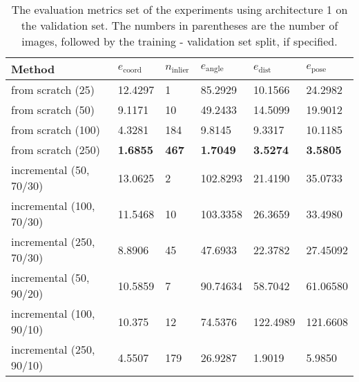 \begin{table}[]
\centering
\begin{tabular}{|l||lllll|} \hline
Method                   & $e_{\text{coord}}$ & $n_{\text{inlier}}$ & $e_{\text{angle}}$ & $e_{\text{dist}}$ & $e_{\text{pose}}$ \\ \hline \hline
from scratch (25)        & 12.4297            & 1                   & 85.2929            & 10.1566           & 24.2982           \\ \hline
from scratch (50)        & 9.1171             & 10                  & 49.2433            & 14.5099           & 19.9012           \\ \hline 
from scratch (100)       & 4.3281             & 184                 & 9.8145             & 9.3317            & 10.1185           \\ \hline
from scratch (250)       & \textbf{1.6855}             & \textbf{467}                 & \textbf{1.7049}             & \textbf{3.5274}            & \textbf{3.5805}            \\ \hline \rowcolor{Gray}
incremental (50, 70/30)  & 13.0625            & 2                   & 102.8293           & 21.4190           & 35.0733           \\ \hline\rowcolor{Gray}
incremental (100, 70/30) & 11.5468            & 10                  & 103.3358           & 26.3659           & 33.4980           \\ \hline \rowcolor{Gray}
incremental (250, 70/30) & 8.8906             & 45                  & 47.6933            & 22.3782           & 27.45092          \\ \hline
incremental (50, 90/20)  & 10.5859            & 7                   & 90.74634           & 58.7042           & 61.06580          \\ \hline 
incremental (100, 90/10) & 10.375             & 12                  & 74.5376            & 122.4989          & 121.6608          \\ \hline
incremental (250, 90/10) & 4.5507             & 179                 & 26.9287            & 1.9019            & 5.9850           \\ \hline
\end{tabular}
\caption{The evaluation metrics set of the experiments using architecture 1 on the validation set. The numbers in parentheses are the number of images, followed by the training - validation set split, if specified.}
\label{table:experiments_online_sratch_arch1}
\end{table}
      			
